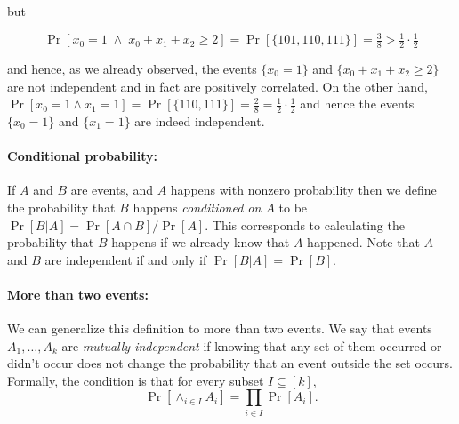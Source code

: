 but

\begin{equation*}

\Pr[x_0 =1 \; \wedge \; x_0+x_1+x_2 \geq 2 ] = \Pr[ \{101,110,111 \} ] = \tfrac{3}{8} > \tfrac{1}{2} \cdot \tfrac{1}{2}

\end{equation*}

and hence, as we already observed, the events \(\{ x_0 = 1 \}\) and
\(\{ x_0+x_1+x_2 \geq 2 \}\) are not independent and in fact are
positively correlated. On the other hand,
\(\Pr[ x_0 = 1 \wedge x_1 = 1 ] = \Pr[ \{110,111 \}] = \tfrac{2}{8} = \tfrac{1}{2} \cdot \tfrac{1}{2}\)
and hence the events \(\{x_0 = 1 \}\) and \(\{ x_1 = 1 \}\) are indeed
independent.

\hypertarget{disjoint}{}

\paragraph{Conditional probability:} If \(A\) and \(B\) are events, and
\(A\) happens with nonzero probability then we define the probability
that \(B\) happens \emph{conditioned on \(A\)} to be
\(\Pr[B|A] = \Pr[A \cap B]/\Pr[A]\). This corresponds to calculating the
probability that \(B\) happens if we already know that \(A\) happened.
Note that \(A\) and \(B\) are independent if and only if
\(\Pr[B|A]=\Pr[B]\).

\paragraph{More than two events:} We can generalize this definition to
more than two events. We say that events \(A_1,\ldots,A_k\) are
\emph{mutually independent} if knowing that any set of them occurred or
didn't occur does not change the probability that an event outside the
set occurs. Formally, the condition is that for every subset
\(I \subseteq [k]\),
\begin{equation*}

\Pr[ \wedge_{i\in I} A_i] =\prod_{i\in I} \Pr[A_i].

\end{equation*}

